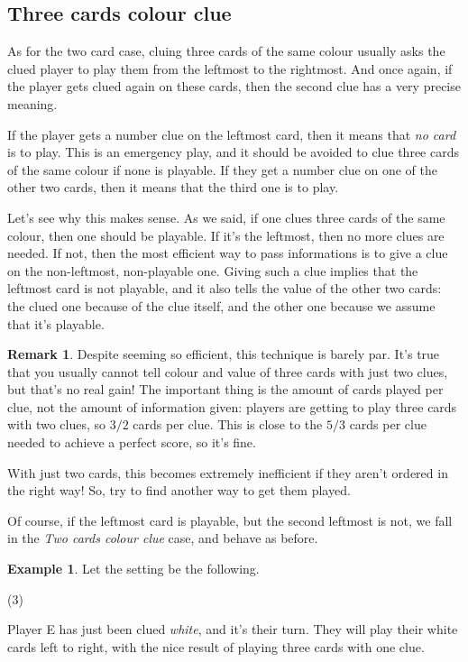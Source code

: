 \documentclass[a4paper]{article}
\theoremstyle{plain}
\theoremstyle{definition}
\newtheorem{remark}[theorem]{Remark}
\newtheorem{example}[theorem]{Example}
\begin{document}
\subsection{Three cards colour clue}

As for the two card case, cluing three cards of the same colour usually asks the clued player to play them from the leftmost to the rightmost. And once again, if the player gets clued again on these cards, then the second clue has a very precise meaning.

If the player gets a number clue on the leftmost card, then it means that \textit{no card} is to play. This is an emergency play, and it should be avoided to clue three cards of the same colour if none is playable. If they get a number clue on one of the other two cards, then it means that the third one is to play.

Let's see why this makes sense. As we said, if one clues three cards of the same colour, then one should be playable. If it's the leftmost, then no more clues are needed. If not, then the most efficient way to pass informations is to give a clue on the non-leftmost, non-playable one. Giving such a clue implies that the leftmost card is not playable, and it also tells the value of the other two cards: the clued one because of the clue itself, and the other one because we assume that it's playable.

\begin{remark}
	Despite seeming so efficient, this technique is barely par. It's true that you usually cannot tell colour and value of three cards with just two clues, but that's no real gain! The important thing is the amount of cards played per clue, not the amount of information given: players are getting to play three cards with two clues, so $3/2$ cards per clue. This is close to the $5/3$ cards per clue needed to achieve a perfect score, so it's fine.
	
	With just two cards, this becomes extremely inefficient if they aren't ordered in the right way! So, try to find another way to get them played. 
\end{remark}

Of course, if the leftmost card is playable, but the second leftmost is not, we fall in the \textit{Two cards colour clue} case, and behave as before.

\begin{example}
	
	Let the setting be the following.
	
	\begin{tasks}(3)
		\task[+]      
		\task[A]    
		\task[B]    
		\task[C]    
		\task[D]    
		\task[E]     
	\end{tasks}
	
	Player E has just been clued \textit{white}, and it's their turn. They will play their white cards left to right, with the nice result of playing three cards with one clue.
	
\end{example}
\end{document}

